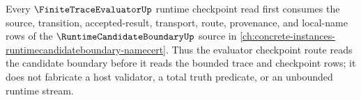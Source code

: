 Every $\FiniteTraceEvaluatorUp$ runtime checkpoint read first consumes the source, transition, accepted-result, transport, route, provenance, and local-name rows of the $\RuntimeCandidateBoundaryUp$ source in \autoref{ch:concrete-instances-runtimecandidateboundary-namecert}. Thus the evaluator checkpoint route reads the candidate boundary before it reads the bounded trace and checkpoint rows; it does not fabricate a host validator, a total truth predicate, or an unbounded runtime stream.
